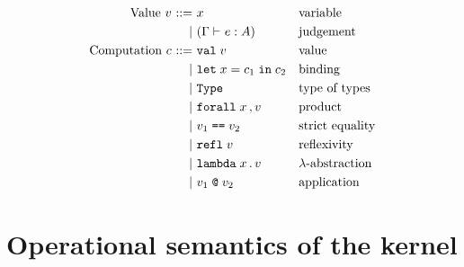 \documentclass{article}
\makeatletter
\newcommand{\ctx}{\Gamma}
\newcommand{\ent}[1][]{\vdash_{#1}}
\newcommand{\bnfis}{\mathbin{{:}{:}{=}}}
\newcommand{\bnfor}{\mathbin{\mid}}
\newcommand{\val}[1]{\mathtt{val}\;#1}
\newcommand{\typ}{\mathtt{Type}}
\newcommand{\letin}[1]{\mathtt{let}\;#1\;\mathtt{in}\;}
\newcommand{\fra}[1]{\mathtt{forall}\;#1\,\mathtt{,}\,}
\newcommand{\equ}[2]{#1 \;\text{\texttt{==}}\; #2}
\newcommand{\rfl}[1]{\mathtt{refl}\; #1}
\newcommand{\lmb}[1]{\mathtt{lambda}\; #1 \,.\,}
\newcommand{\apl}[2]{#1 \;\texttt{@}\; #2}
\makeatother
\begin{document}
\begin{align*}
  \text{Value}\ v\
    \bnfis \ & x                              & & \text{variable}\\
    \bnfor \ & (\ctx \ent e : A)              & & \text{judgement}
  \\
  \text{Computation}\ c\
    \bnfis \ & \val{v}                        & & \text{value}\\
    \bnfor \ & \letin{x = c_1} c_2            & & \text{binding}\\
    \bnfor \ & \typ                          & & \text{type of types}\\
    \bnfor \ & \fra{x} v                      & & \text{product} \\
    \bnfor \ & \equ{v_1}{v_2}                 & & \text{strict equality} \\
    \bnfor \ & \rfl{v}                        & & \text{reflexivity} \\
    \bnfor \ & \lmb{x} v                      & & \text{$\lambda$-abstraction} \\
    \bnfor \ & \apl{v_1}{v_2}                 & & \text{application}
\end{align*}


\section{Operational semantics of the kernel}
\end{document}
